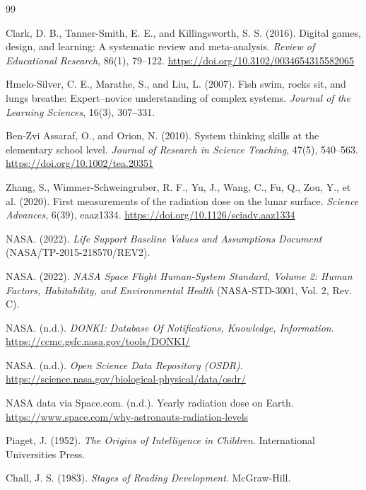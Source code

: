 \documentclass[11pt,a4paper]{article}
\begin{document}
\begin{thebibliography}{99}

Clark, D. B., Tanner-Smith, E. E., and Killingsworth, S. S. (2016).
\newblock Digital games, design, and learning: A systematic review and meta-analysis.
\newblock \emph{Review of Educational Research}, 86(1), 79--122.
\newblock \url{https://doi.org/10.3102/0034654315582065}

Hmelo-Silver, C. E., Marathe, S., and Liu, L. (2007).
\newblock Fish swim, rocks sit, and lungs breathe: Expert--novice understanding of complex systems.
\newblock \emph{Journal of the Learning Sciences}, 16(3), 307--331.

Ben-Zvi Assaraf, O., and Orion, N. (2010).
\newblock System thinking skills at the elementary school level.
\newblock \emph{Journal of Research in Science Teaching}, 47(5), 540--563.
\newblock \url{https://doi.org/10.1002/tea.20351}

Zhang, S., Wimmer-Schweingruber, R. F., Yu, J., Wang, C., Fu, Q., Zou, Y., et al. (2020).
\newblock First measurements of the radiation dose on the lunar surface.
\newblock \emph{Science Advances}, 6(39), eaaz1334.
\newblock \url{https://doi.org/10.1126/sciadv.aaz1334}

NASA. (2022).
\newblock \emph{Life Support Baseline Values and Assumptions Document} (NASA/TP-2015-218570/REV2).

NASA. (2022).
\newblock \emph{NASA Space Flight Human-System Standard, Volume 2: Human Factors, Habitability, and Environmental Health} (NASA-STD-3001, Vol. 2, Rev. C).

NASA. (n.d.).
\newblock \emph{DONKI: Database Of Notifications, Knowledge, Information}.
\newblock \url{https://ccmc.gsfc.nasa.gov/tools/DONKI/}

NASA. (n.d.).
\newblock \emph{Open Science Data Repository (OSDR)}.
\newblock \url{https://science.nasa.gov/biological-physical/data/osdr/}

NASA data via Space.com. (n.d.).
\newblock Yearly radiation dose on Earth.
\newblock \url{https://www.space.com/why-astronauts-radiation-levels}

Piaget, J. (1952).
\newblock \emph{The Origins of Intelligence in Children}. International Universities Press.

Chall, J. S. (1983).
\newblock \emph{Stages of Reading Development}. McGraw-Hill.


\end{thebibliography}
\end{document}
